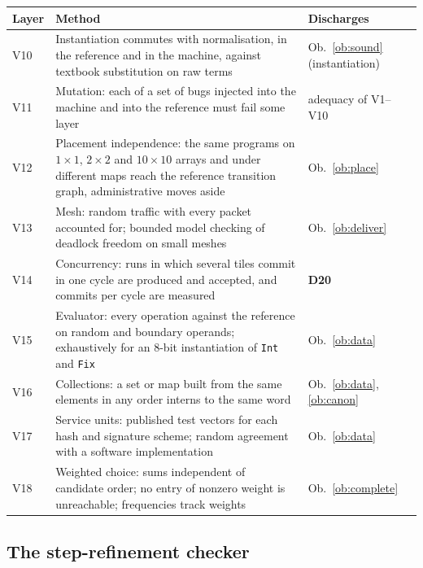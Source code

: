 \documentclass[10.5pt,a4paper]{extarticle}
\newcommand{\kw}[1]{\texttt{#1}}
\newcommand{\dec}[1]{\textbf{D#1}}
\theoremstyle{definition}
\theoremstyle{remark}
\begin{document}
\medskip\noindent
\begin{tabularx}{\textwidth}{@{}l X X@{}}
\toprule
Layer & Method & Discharges\\
\midrule
V10 & Instantiation commutes with normalisation, in the reference and in the
     machine, against textbook substitution on raw terms
     & Ob.~\ref{ob:sound} (instantiation)\\
V11 & Mutation: each of a set of bugs injected into the machine and into the
     reference must fail some layer & adequacy of V1--V10\\
V12 & Placement independence: the same programs on $1 \times 1$,
     $2 \times 2$ and $10 \times 10$ arrays and under different maps reach the
     reference transition graph, administrative moves aside
     & Ob.~\ref{ob:place}\\
V13 & Mesh: random traffic with every packet accounted for; bounded model
     checking of deadlock freedom on small meshes & Ob.~\ref{ob:deliver}\\
V14 & Concurrency: runs in which several tiles commit in one cycle are
     produced and accepted, and commits per cycle are measured
     & \dec{20}\\
V15 & Evaluator: every operation against the reference on random and
     boundary operands; exhaustively for an 8-bit instantiation of \kw{Int}
     and \kw{Fix} & Ob.~\ref{ob:data}\\
V16 & Collections: a set or map built from the same elements in any order
     interns to the same word & Ob.~\ref{ob:data}, \ref{ob:canon}\\
V17 & Service units: published test vectors for each hash and signature
     scheme; random agreement with a software implementation & Ob.~\ref{ob:data}\\
V18 & Weighted choice: sums independent of candidate order; no entry of
     nonzero weight is unreachable; frequencies track weights & Ob.~\ref{ob:complete}\\
\bottomrule
\end{tabularx}

\subsection{The step-refinement checker}
\end{document}
